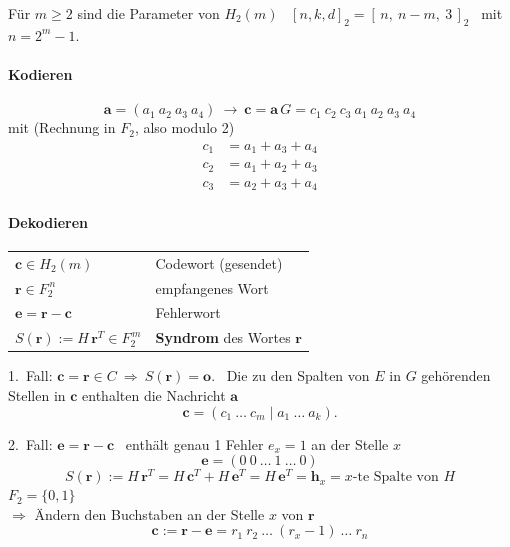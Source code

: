 \begin{satz}
Für $m \geq 2$ sind die Parameter von $H_2(m)$ \ $[n, k, d]_2 = [\,n,\ n - m,\ 3\,]_2$ \ mit $n = 2^m - 1$.
\end{satz}

\paragraph{Kodieren}
\[ \mathbf{a} = (a_1\ a_2\ a_3\ a_4) \ \to \ \mathbf{c} = \mathbf{a}\,G = c_1\ c_2\ c_3\ a_1\ a_2\ a_3\ a_4 \]
mit (Rechnung in $F_2$, also modulo 2)
\begin{align*}
c_1 &= a_1 + a_3 + a_4 \\
c_2 &= a_1 + a_2 + a_3 \\
c_3 &= a_2 + a_3 + a_4
\end{align*}

\paragraph{Dekodieren}
\begin{tabular}{ll}
$\mathbf{c} \in H_2(m)$ & Codewort (gesendet) \\
$\mathbf{r} \in F_2^{\,n}$ & empfangenes Wort \\
$\mathbf{e} = \mathbf{r} - \mathbf{c}$ & Fehlerwort \\
$S(\mathbf{r}) := H\,\mathbf{r}^T \in F_2^{\,m}$ & \textbf{Syndrom} des Wortes $\mathbf{r}$ \\
\end{tabular}

1.\ Fall: $\mathbf{c} = \mathbf{r} \in C \ \Rightarrow \ S(\mathbf{r}) = \mathbf{o}$. \ Die zu den Spalten von $E$ in $G$ gehörenden Stellen in $\mathbf{c}$ enthalten die Nachricht $\mathbf{a}$
\[ \mathbf{c} = (c_1\ \dots\ c_m \mid a_1\ \dots\ a_k). \]

2.\ Fall: $\mathbf{e} = \mathbf{r} - \mathbf{c}$ \ enthält genau 1 Fehler $e_x = 1$ an der Stelle $x$
\[ \mathbf{e} = (0\ 0\ \dots\ 1\ \dots\ 0) \]
\[ S(\mathbf{r}) := H\,\mathbf{r}^T = H\,\mathbf{c}^T + H\,\mathbf{e}^T = H\,\mathbf{e}^T = \mathbf{h}_x = x\text{-te Spalte von } H \]
$F_2 = \{0, 1\}$\\
$\Rightarrow$ Ändern den Buchstaben an der Stelle $x$ von $\mathbf{r}$
\[ \mathbf{c} := \mathbf{r} - \mathbf{e} = r_1\ r_2\ \dots\ (r_x - 1)\ \dots\ r_n \]

